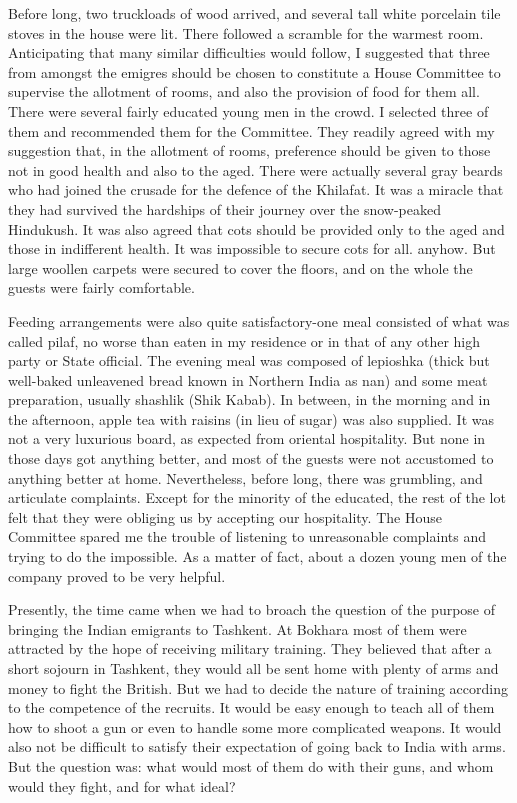 Before long, two truckloads of wood arrived, and several tall white porcelain tile stoves in the house were lit. There followed a scramble for the warmest room. Anticipating that many similar difficulties would follow, I suggested that three from amongst the emigres should be chosen to constitute a House Committee to supervise the allotment of rooms, and also the provision of food for them all. There were several 
fairly educated young men in the crowd. I selected three of them and recommended them for the Committee. They readily agreed with my suggestion that, in the allotment of rooms, preference should be given to those not in good health and also to the aged. There were actually several gray beards who had joined the crusade for the defence of the Khilafat. It was a miracle that they had survived the hardships of their journey 
over the snow-peaked Hindukush. It was also agreed that cots should be provided only to the aged and those in indifferent health. It was impossible to secure cots for all. anyhow. But large woollen carpets were secured to cover the floors, and on the whole the guests were fairly comfortable. 

Feeding arrangements were also quite satisfactory-one meal consisted of what was called pilaf, no worse than eaten in my residence or in that of any other high party or State official. The evening meal was composed of lepioshka (thick but well-baked unleavened bread known in Northern India as nan) and some meat preparation, usually shashlik (Shik Kabab). In between, in the morning and in the afternoon, apple tea with raisins (in lieu of sugar) was also supplied. It was not a very luxurious board, as expected from oriental hospitality. But none in those days got anything better, and most of the guests were not accustomed to anything better at home. Nevertheless, before long, there was grumbling, and articulate complaints. Except for the minority of the educated, the rest of the lot felt that they were obliging us by accepting our 
hospitality. The House Committee spared me the trouble of listening to unreasonable complaints and trying to do the impossible. As a matter of fact, about a dozen young men of the company proved to be very helpful. 

Presently, the time came when we had to broach the question of the purpose of bringing the Indian emigrants to Tashkent. At Bokhara most of them were attracted by the hope of receiving military training. They believed that after a short sojourn in Tashkent, they would all be sent home with plenty of arms and money to fight the British. But we had to decide the nature of training according to the competence of the recruits. It would be easy enough to teach all of them how to shoot a gun or even to handle some more complicated weapons. It would also not be difficult to satisfy their expectation of going back to India with arms. But the question was: what would most of them do with their guns, and whom would they fight, and for what ideal? 

